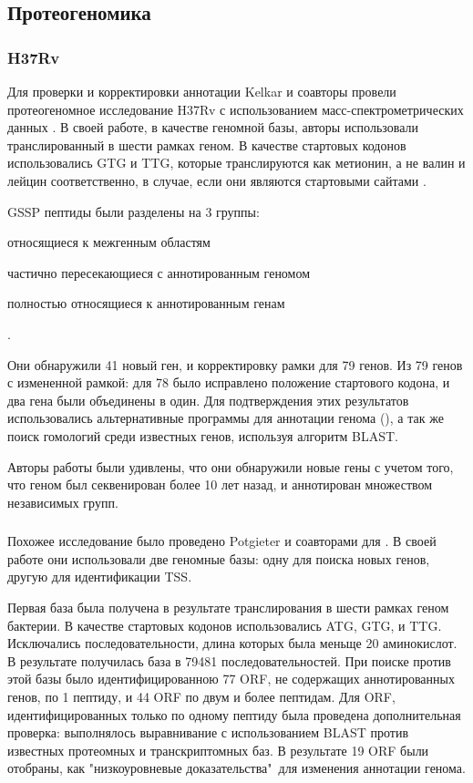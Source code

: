 \subsection{Протеогеномика }
\subsubsection{ H37Rv}
Для проверки и корректировки аннотации Kelkar и соавторы провели протеогеномное исследование  H37Rv с использованием масс-спектрометрических данных \cite{kelkar2011proteogenomic}. В своей работе, в качестве геномной базы, авторы использовали транслированный в шести рамках геном. В качестве стартовых кодонов использовались GTG и TTG, которые транслируются как метионин, а не валин и лейцин соответственно, в случае, если они являются стартовыми сайтами \cite{cole1998erratum}. 

GSSP пептиды были разделены на 3 группы:
\begin{inparaenum}
    \item относящиеся к межгенным областям
    \item частично пересекающиеся с аннотированным геномом
    \item полностью относящиеся к аннотированным генам
\end{inparaenum}.

Они обнаружили 41 новый ген, и корректировку рамки для 79 генов. Из 79 генов с измененной рамкой: для 78 было исправлено положение стартового кодона, и два гена были объединены в один. Для подтверждения этих результатов использовались альтернативные программы для аннотации генома (), а так же поиск гомологий среди известных генов, используя алгоритм BLAST. 

Авторы работы были удивлены, что они обнаружили новые гены с учетом того, что геном был секвенирован более 10 лет назад, и аннотирован множеством независимых групп.

\subsubsection{}
Похожее исследование было проведено Potgieter и соавторами для . В своей работе они использовали две геномные базы: одну для поиска новых генов, другую для идентификации TSS. 

Первая база была получена в результате транслирования в шести рамках геном бактерии. В качестве стартовых кодонов использовались ATG, GTG, и TTG. Исключались последовательности, длина которых была меньще 20 аминокислот. В результате получилась база в 79481 последовательностей. При поиске против этой базы было идентифицированною 77 ORF, не содержащих аннотированных генов, по 1 пептиду, и 44 ORF по двум и более пептидам. Для ORF, идентифицированных только по одному пептиду была проведена дополнительная проверка: выполнялось выравнивание с использованием BLAST против известных протеомных и транскриптомных баз. В результате 19 ORF были отобраны, как "низкоуровневые доказательства"\ для изменения аннотации генома.

